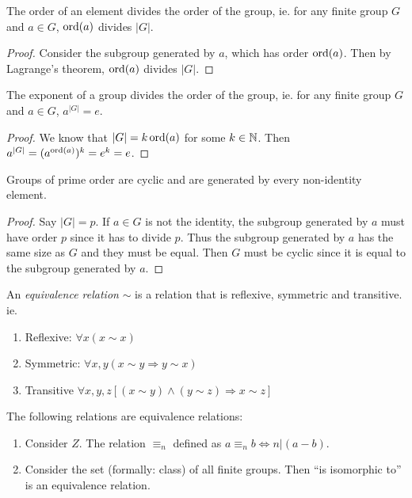 \documentclass[a4paper]{article}
\begin{document}
  \begin{cor}
    The order of an element divides the order of the group, ie. for any finite group $G$ and $a\in G$, $\operatorname{ord}(a)$ divides $|G|$.
  \end{cor}
  \begin{proof}
    Consider the subgroup generated by $a$, which has order $\operatorname{ord}(a)$. Then by Lagrange's theorem, $\operatorname{ord}(a)$ divides $|G|$.
  \end{proof}

  \begin{cor}
    The exponent of a group divides the order of the group, ie. for any finite group $G$ and $a\in G$, $a^{|G|} = e$.
  \end{cor}

  \begin{proof}
    We know that $|G| = k\operatorname{ord}(a)$ for some $k\in \mathbb{N}$. Then $a^{|G|} = (a^{\operatorname{ord}(a)})^k = e^k = e$.
  \end{proof}

  \begin{cor}
    Groups of prime order are cyclic and are generated by every non-identity element.
  \end{cor}

  \begin{proof}
    Say $|G| = p$. If $a\in G$ is not the identity, the subgroup generated by $a$ must have order $p$ since it has to divide $p$. Thus the subgroup generated by $a$ has the same size as $G$ and they must be equal. Then $G$ must be cyclic since it is equal to the subgroup generated by $a$.
  \end{proof}

  \begin{defi}
    An \emph{equivalence relation} $\sim$ is a relation that is reflexive, symmetric and transitive. ie.
    \begin{enumerate}
      \item Reflexive: $\forall x(x\sim x)$
      \item Symmetric: $\forall x, y(x\sim y \Rightarrow y\sim x)$
      \item Transitive $\forall x, y, z[(x\sim y) \wedge (y\sim z)\Rightarrow x\sim z]$
    \end{enumerate}
  \end{defi}

  \begin{eg}
    The following relations are equivalence relations:
    \begin{enumerate}
      \item Consider $Z$. The relation $\equiv_n$ defined as $a\equiv_n b \Leftrightarrow n | (a - b)$.
      \item Consider the set (formally: class) of all finite groups. Then ``is isomorphic to'' is an equivalence relation.
    \end{enumerate}
  \end{eg}
\end{document}

